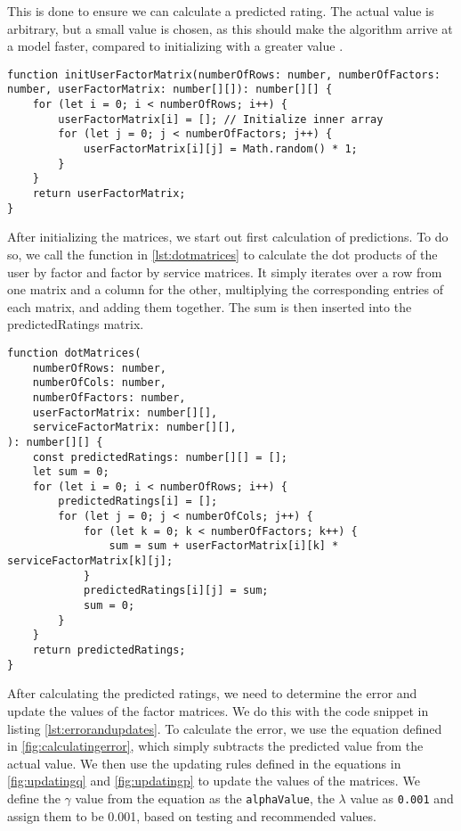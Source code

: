 This is done to ensure we can calculate a predicted rating.
The actual value is arbitrary, but a small value is chosen, as this should make the algorithm arrive at a model faster, compared to initializing with a greater value \cite{FunkMatrixFactorization}.
\begin{lstlisting}[caption={Initializing the user and factor matrix}, captionpos=b, label={lst:initUserFactor}]
function initUserFactorMatrix(numberOfRows: number, numberOfFactors: number, userFactorMatrix: number[][]): number[][] {
    for (let i = 0; i < numberOfRows; i++) {
        userFactorMatrix[i] = []; // Initialize inner array
        for (let j = 0; j < numberOfFactors; j++) {
            userFactorMatrix[i][j] = Math.random() * 1;
        }
    }   
    return userFactorMatrix;
}
\end{lstlisting}
After initializing the matrices, we start out first calculation of predictions.
To do so, we call the function in \autoref{lst:dotmatrices} to calculate the dot products of the user by factor and factor by service matrices.
It simply iterates over a row from one matrix and a column for the other, multiplying the corresponding entries of each matrix, and adding them together.
The sum is then inserted into the predictedRatings matrix.
\begin{lstlisting}[caption={Calculating the dot predict of a matrix}, captionpos=b, label={lst:dotmatrices}]
function dotMatrices(
    numberOfRows: number,
    numberOfCols: number,
    numberOfFactors: number,
    userFactorMatrix: number[][],
    serviceFactorMatrix: number[][],
): number[][] {
    const predictedRatings: number[][] = [];
    let sum = 0;
    for (let i = 0; i < numberOfRows; i++) {
        predictedRatings[i] = [];
        for (let j = 0; j < numberOfCols; j++) {
            for (let k = 0; k < numberOfFactors; k++) {
                sum = sum + userFactorMatrix[i][k] * serviceFactorMatrix[k][j];
            }
            predictedRatings[i][j] = sum;
            sum = 0;
        }
    } 
    return predictedRatings;
}
\end{lstlisting}
After calculating the predicted ratings, we need to determine the error and update the values of the factor matrices.
We do this with the code snippet in listing \autoref{lst:errorandupdates}.
To calculate the error, we use the equation defined in \autoref{fig:calculatingerror}, which simply subtracts the predicted value from the actual value.
We then use the updating rules defined in the equations in \autoref{fig:updatingq} and \autoref{fig:updatingp} to update the values of the matrices.
We define the $\gamma$ value from the equation as the \texttt{alphaValue}, the $\lambda$ value as \texttt{0.001} and assign them to be 0.001, based on testing and recommended values.

